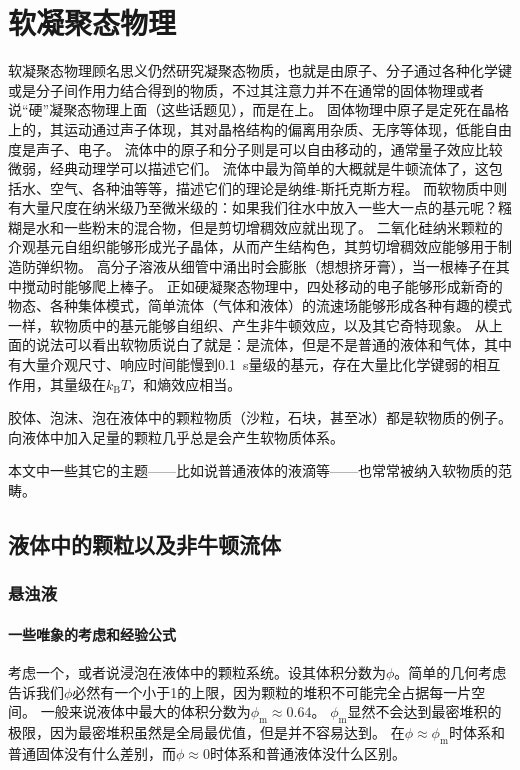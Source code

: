 \part{软凝聚态物理}

软凝聚态物理顾名思义仍然研究凝聚态物质，也就是由原子、分子通过各种化学键或是分子间作用力结合得到的物质，不过其注意力并不在通常的固体物理或者说“硬”凝聚态物理上面（这些话题见\soliddoc），而是在上。
固体物理中原子是定死在晶格上的，其运动通过声子体现，其对晶格结构的偏离用杂质、无序等体现，低能自由度是声子、电子。
流体中的原子和分子则是可以自由移动的，通常量子效应比较微弱，经典动理学可以描述它们。
流体中最为简单的大概就是牛顿流体了，这包括水、空气、各种油等等，描述它们的理论是纳维-斯托克斯方程。
而软物质中则有大量尺度在纳米级乃至微米级的：如果我们往水中放入一些大一点的基元呢？糨糊是水和一些粉末的混合物，但是剪切增稠效应就出现了。
二氧化硅纳米颗粒的介观基元自组织能够形成光子晶体，从而产生结构色，其剪切增稠效应能够用于制造防弹织物。
高分子溶液从细管中涌出时会膨胀（想想挤牙膏），当一根棒子在其中搅动时能够爬上棒子。
正如硬凝聚态物理中，四处移动的电子能够形成新奇的物态、各种集体模式，简单流体（气体和液体）的流速场能够形成各种有趣的模式一样，软物质中的基元能够自组织、产生非牛顿效应，以及其它奇特现象。
从上面的说法可以看出软物质说白了就是：是流体，但是不是普通的液体和气体，其中有大量介观尺寸、响应时间能慢到\SI{0.1}{s}量级的基元，存在大量比化学键弱的相互作用，其量级在$k_\text{B} T$，和熵效应相当。

胶体、泡沫、泡在液体中的颗粒物质（沙粒，石块，甚至冰）都是软物质的例子。向液体中加入足量的颗粒几乎总是会产生软物质体系。

本文中一些其它的主题——比如说普通液体的液滴等——也常常被纳入软物质的范畴。

\chapter{液体中的颗粒以及非牛顿流体}\label{chap:non-newtonian}

\section{悬浊液}

\subsection{一些唯象的考虑和经验公式}

考虑一个，或者说浸泡在液体中的颗粒系统。设其体积分数为$\phi$。简单的几何考虑告诉我们$\phi$必然有一个小于1的上限，因为颗粒的堆积不可能完全占据每一片空间。
一般来说液体中最大的体积分数为$\phi_\text{m} \approx 0.64$。
$\phi_\text{m}$显然不会达到最密堆积的极限，因为最密堆积虽然是全局最优值，但是并不容易达到。
在$\phi \approx \phi_\text{m}$时体系和普通固体没有什么差别，而$\phi \approx 0$时体系和普通液体没什么区别。

